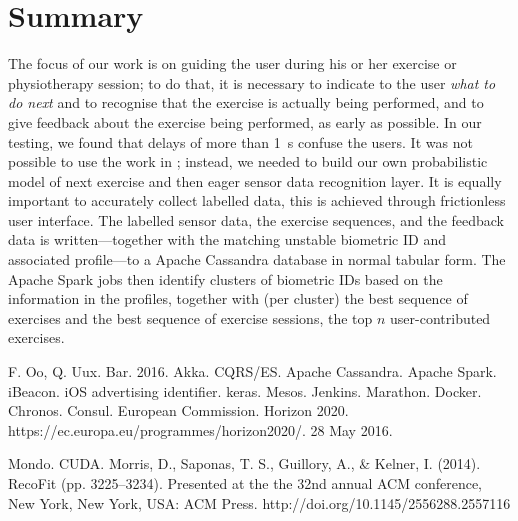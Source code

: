 \documentclass[a4paper, 10 pt, conference]{IEEEtran}
\begin{document}
\section{Summary}

The focus of our work is on guiding the user during his or her exercise or physiotherapy session; to do that, it is necessary to indicate to the user \emph{what to do next} and to recognise that the exercise is actually being performed, and to give feedback about the exercise being performed, as early as possible. In our testing, we found that delays of more than \SI{1}{\second} confuse the users. It was not possible to use the work in \cite{morris:2014ir}; instead, we needed to build our own probabilistic model of next exercise and then eager sensor data recognition layer. It is equally important to accurately collect labelled data, this is achieved through frictionless user interface. The labelled sensor data, the exercise sequences, and the feedback data is written---together with the matching unstable biometric ID and associated profile---to a Apache Cassandra database in normal tabular form. The Apache Spark jobs then identify clusters of biometric IDs based on the information in the profiles, together with (per cluster) the best sequence of exercises and the best sequence of exercise sessions, the top $n$ user-contributed exercises.

\addtolength{\textheight}{-12cm}  %

\begin{thebibliography}{99}

 F. Oo, Q. Uux. Bar. 2016.
 Akka.
 CQRS/ES.
 Apache Cassandra.
 Apache Spark.
 iBeacon.
 iOS advertising identifier.
 keras.
 Mesos.
 Jenkins.
 Marathon.
 Docker.
 Chronos.
 Consul.
 European Commission. Horizon 2020. https://ec.europa.eu/programmes/horizon2020/. 28 May 2016.

 Mondo.
 CUDA.
 Morris, D., Saponas, T. S., Guillory, A., \& Kelner, I. (2014). RecoFit (pp. 3225--3234). Presented at the the 32nd annual ACM conference, New York, New York, USA: ACM Press. http://doi.org/10.1145/2556288.2557116

\end{thebibliography}
\end{document}
